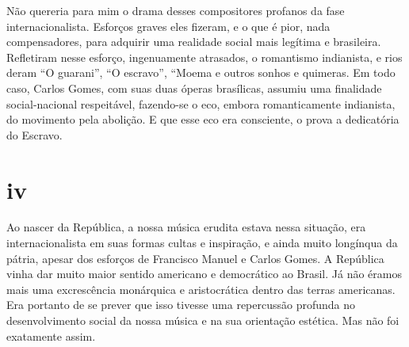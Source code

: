 Não quereria para mim o drama desses compositores profanos da fase
internacionalista. Esforços graves eles fizeram, e o que é pior, nada
compensadores, para adquirir uma realidade social mais legítima e
brasileira. Refletiram nesse esforço, ingenuamente atrasados, o
romantismo indianista, e rios deram ``O guarani'', ``O escravo'', ``Moema e outros
sonhos e quimeras. Em todo caso, Carlos Gomes, com suas duas óperas
brasílicas, assumiu uma finalidade social-nacional respeitável,
fazendo-se o eco, embora romanticamente indianista, do movimento pela
abolição. E que esse eco era consciente, o prova a dedicatória do
Escravo.

\section*{iv}

Ao nascer da República, a nossa música erudita estava nessa situação,
era internacionalista em suas formas cultas e inspiração, e ainda muito
longínqua da pátria, apesar dos esforços de Francisco Manuel e Carlos
Gomes. A República vinha dar muito maior sentido americano e democrático
ao Brasil. Já não éramos mais uma excrescência monárquica e
aristocrática dentro das terras americanas. Era portanto de se prever
que isso tivesse uma repercussão profunda no desenvolvimento social da
nossa música e na sua orientação estética. Mas não foi exatamente assim.

